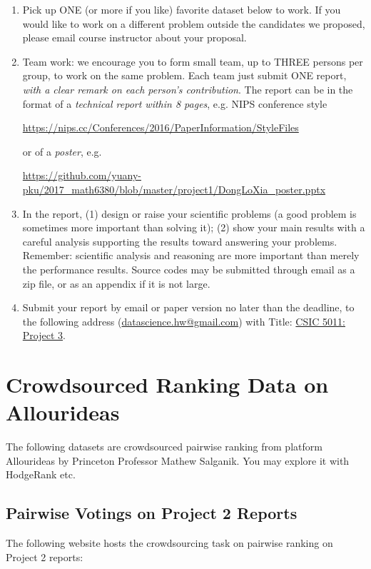 \documentclass[11pt]{article}
\begin{document}
\begin{enumerate}
\item Pick up ONE (or more if you like) favorite dataset below to work. If you would like to work on a different problem outside the candidates we proposed, please email course instructor about your proposal.  
\item Team work: we encourage you to form small team, up to THREE persons per group, to work on the same problem. Each team just submit ONE report, \emph{with a clear remark on each person's contribution}. The report can be in the format of a \emph{technical report within 8 pages}, e.g. NIPS conference style 
\begin{center}
\url{https://nips.cc/Conferences/2016/PaperInformation/StyleFiles} 
\end{center}
or of a \emph{poster}, e.g. 
\begin{center}%
\url{https://github.com/yuany-pku/2017_math6380/blob/master/project1/DongLoXia_poster.pptx}
\end{center}
\item In the report, (1) design or raise your scientific problems (a good problem is sometimes more important than solving it); (2) show your main results with a careful analysis supporting the results toward answering your problems. Remember: scientific analysis and reasoning are more important than merely the performance results. Source codes may be submitted through email as a zip file, or as an appendix if it is not large.    
\item Submit your report by email or paper version no later than the deadline, to the following address (\href{mailto:datascience.hw@gmail.com}{datascience.hw@gmail.com}) with Title: \underline{CSIC 5011: Project 3}. %
\end{enumerate}

\section{Crowdsourced Ranking Data on Allourideas}
The following datasets are crowdsourced pairwise ranking from platform Allourideas by Princeton Professor Mathew Salganik. You may explore it with HodgeRank etc. 

\subsection{Pairwise Votings on Project 2 Reports}
The following website hosts the crowdsourcing task on pairwise ranking on Project 2 reports:
\end{document}
